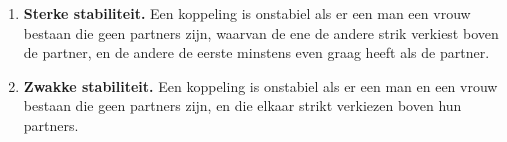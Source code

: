\begin{itemize}
\begin{itemize}
\begin{enumerate}
            \item \textbf{Sterke stabiliteit.} Een koppeling is onstabiel als er een man een vrouw bestaan die geen partners zijn, waarvan de ene de andere strik verkiest boven de partner, en de andere de eerste minstens even graag heeft als de partner.

            \item \textbf{Zwakke stabiliteit.} Een koppeling is onstabiel als er een man en een vrouw bestaan die geen partners zijn, en die elkaar strikt verkiezen boven hun partners.
        \end{enumerate}
    \end{itemize}
\end{itemize}